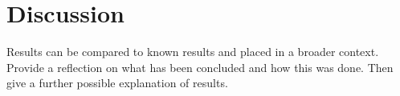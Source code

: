 \section{Discussion}
Results can be compared to known results and placed in a broader context.
Provide a reflection on what has been concluded and how this was done.
Then give a further possible explanation of results.
